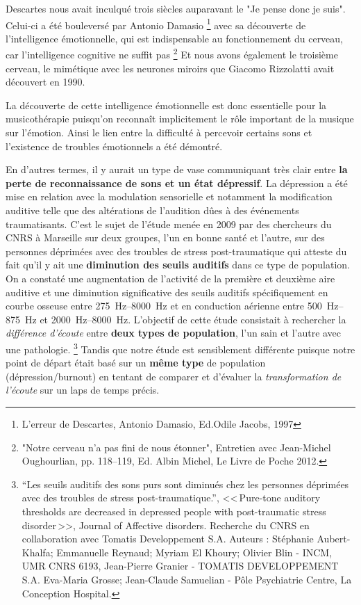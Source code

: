 Descartes nous avait inculqué trois siècles auparavant le "Je pense donc je suis". Celui-ci  a 
été bouleversé par Antonio Damasio \footnote {{L'erreur de Descartes}, Antonio Damasio, 
Ed.Odile Jacobs, 1997} 
avec sa découverte de l'intelligence émotionnelle, qui est indispensable au fonctionnement 
du 
cerveau, car  l'intelligence cognitive ne suffit pas%
\footnote{"Notre cerveau n'a pas fini de nous étonner", Entretien avec Jean-Michel 
     Oughourlian, pp. 118--119, Ed. Albin Michel, Le Livre de Poche 2012.}
Et nous avons  également le troisième cerveau, le mimétique avec les neurones miroirs que Giacomo Rizzolatti avait découvert en 1990.
 
La découverte de cette intelligence  émotionnelle est donc essentielle  pour la 
musicothérapie puisqu'on reconnaît implicitement le rôle important de la musique sur 
l'émotion.   
Ainsi le lien entre la difficulté à percevoir certains sons 
et l'existence 
de troubles émotionnels a été démontré.

En d'autres termes, il y
aurait un type de vase communiquant très clair entre\textbf{ la perte de reconnaissance de sons et
un état dépressif}. La dépression a été mise en relation avec la
modulation sensorielle et notamment la modification auditive telle que
des altérations de l'audition dûes à des événements
traumatisants. C'est le sujet de l'étude menée en 2009 par des chercheurs du CNRS à Marseille sur deux
groupes, l'un en bonne santé et l'autre,
sur des personnes déprimées avec des troubles de stress
post-traumatique qui atteste du 
fait qu'il y ait une\textbf{ diminution des seuils auditifs} dans ce type de
population. On a constaté une augmentation de l'activité de la
première et deuxième aire auditive et une diminution significative des
seuils auditifs spécifiquement en courbe osseuse entre
\SIrange{275}{8000}{\Hz} et en conduction aérienne entre
\SIrange{500}{875}{\Hz} et  \SIrange{2000}{8000}{\Hz}.
L'objectif de 
cette étude consistait  à rechercher la\textit{ différence d'écoute} entre
\textbf{deux types de population}, l'un sain et l'autre avec une pathologie. \footnote{``Les seuils auditifs des sons purs 
	sont diminués chez les personnes déprimées avec des
	troubles de stress post-traumatique.'', <<\,Pure-tone auditory 
	thresholds are decreased in depressed people with post-traumatic stress 
disorder\,>>, Journal of Affective disorders. Recherche du CNRS en collaboration
	avec Tomatis Developpement S.A. Auteurs : Stéphanie 
	Aubert-Khalfa; Emmanuelle Reynaud; Myriam El Khoury;
	Olivier Blin - INCM, UMR CNRS 6193, Jean-Pierre Granier -
	TOMATIS DEVELOPPEMENT S.A. Eva-Maria Grosse; Jean-Claude 
	Samuelian - Pôle Psychiatrie Centre, La Conception Hospital.}
Tandis que notre étude est sensiblement différente puisque notre point de départ était basé sur 
un \textbf{même type} de
population (dépression/burnout) en tentant de comparer et d'évaluer
la\textit{ transformation de l'écoute} sur un laps de temps précis.

